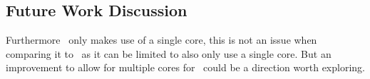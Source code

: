 

\subsection{Future Work Discussion}
Furthermore \Cupaal\ only makes use of a single core, this is not an issue when comparing it to \Jajapy\ as it can be limited to also only use a single core.
But an improvement to allow for multiple cores for \Cupaal\ could be a direction worth exploring.






